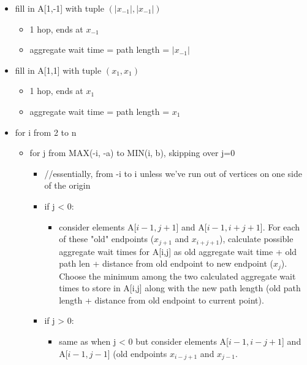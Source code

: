 \documentclass[a4paper]{article}
\begin{document}
\begin{itemize}
    \item fill in A[1,-1] with tuple $(\lvert x_{-1} \rvert, \lvert x_{-1} \rvert)$
    \begin{itemize}
        \item 1 hop, ends at $x_{-1}$
        \item aggregate wait time = path length = $\lvert x_{-1} \rvert$
    \end{itemize}
    \item fill in A[1,1] with tuple $(x_{1}, x_{1})$
    \begin{itemize}
        \item 1 hop, ends at $x_1$
        \item aggregate wait time = path length = $x_1$
    \end{itemize}
\end{itemize}

\begin{itemize}
    \item for i from 2 to n
    \begin{itemize}
        \item for j from MAX(-i, -a) to MIN(i, b), skipping over j=0
        \begin{itemize}
            \item //essentially, from -i to i unless we've run out of vertices on one side of the origin
            \item if j < 0:
            \begin{itemize}
                \item consider elements A[$i-1, j+1$] and A[$i-1, i+j+1$]. For each of these "old" endpoints ($x_{j+1}$ and $x_{i+j+1}$), calculate possible aggregate wait times for A[i,j] as old aggregate wait time + old path len + distance from old endpoint to new endpoint ($x_j$). Choose the minimum among the two calculated aggregate wait times to store in A[i,j] along with the new path length (old path length + distance from old endpoint to current point).
            \end{itemize}
            \item if j > 0:
            \begin{itemize}
                \item same as when j < 0 but consider elements A[$i-1, i-j+1$] and A[$i-1, j-1$] (old endpoints $x_{i-j+1}$ and $x_{j-1}$.
            \end{itemize}
        \end{itemize}
    \end{itemize}
\end{itemize}
\end{document}
